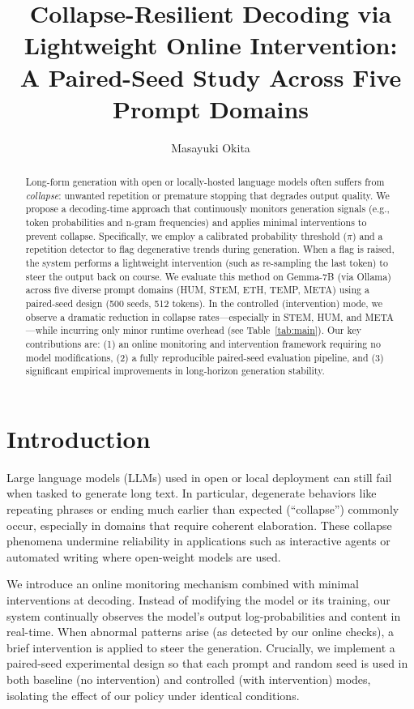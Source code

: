 \documentclass{article}
\begin{document}
\title{Collapse-Resilient Decoding via Lightweight Online Intervention:\\A Paired-Seed Study Across Five Prompt Domains}
\author{Masayuki Okita}
\date{}
\maketitle

\begin{abstract}
Long-form generation with open or locally-hosted language models often suffers from \emph{collapse}: unwanted repetition or premature stopping that degrades output quality. We propose a decoding-time approach that continuously monitors generation signals (e.g., token probabilities and n-gram frequencies) and applies minimal interventions to prevent collapse. Specifically, we employ a calibrated probability threshold ($\pi$) and a repetition detector to flag degenerative trends during generation. When a flag is raised, the system performs a lightweight intervention (such as re-sampling the last token) to steer the output back on course. We evaluate this method on Gemma-7B (via Ollama) across five diverse prompt domains (HUM, STEM, ETH, TEMP, META) using a paired-seed design (500 seeds, 512 tokens). In the controlled (intervention) mode, we observe a dramatic reduction in collapse rates---especially in STEM, HUM, and META---while incurring only minor runtime overhead (see Table~\ref{tab:main}). Our key contributions are: (1) an online monitoring and intervention framework requiring no model modifications, (2) a fully reproducible paired-seed evaluation pipeline, and (3) significant empirical improvements in long-horizon generation stability.
\end{abstract}

\section{Introduction}
Large language models (LLMs) used in open or local deployment can still fail when tasked to generate long text. In particular, degenerate behaviors like repeating phrases or ending much earlier than expected (``collapse'') commonly occur, especially in domains that require coherent elaboration. These collapse phenomena undermine reliability in applications such as interactive agents or automated writing where open-weight models are used.

We introduce an online monitoring mechanism combined with minimal interventions at decoding. Instead of modifying the model or its training, our system continually observes the model's output log-probabilities and content in real-time. When abnormal patterns arise (as detected by our online checks), a brief intervention is applied to steer the generation. Crucially, we implement a paired-seed experimental design so that each prompt and random seed is used in both baseline (no intervention) and controlled (with intervention) modes, isolating the effect of our policy under identical conditions.
\end{document}
